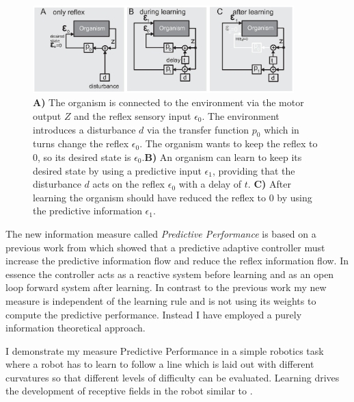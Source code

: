 \begin{figure}[!hbt]
	\begin{center}
		\includegraphics[width=0.9\textwidth]{figures/ppmeasure/1}
	\end{center}
	\caption[Information flow in the adaptive controller]{ 
	  {\bf A)} The organism is connected to the
          environment via the motor output $Z$ and the reflex sensory
          input $\epsilon_{0}$. The environment introduces a disturbance $d$
          via the transfer function $p_0$ which in turns change the
          reflex $\epsilon_{0}$. The organism wants to keep the reflex to 0, so
          its desired state is $\epsilon_{0}$.{\bf B)} An organism can learn to
          keep its desired state by using a predictive input $\epsilon_{1}$,
          providing that the disturbance $d$ acts on the reflex $\epsilon_{0}$
          with a delay of $t$. {\bf C)} After learning the organism
          should have reduced the reflex to 0 by using the predictive
          information $\epsilon_{1}$.  
	  \label{PPmeasure:Figure1}}
\end{figure}
 


The new information measure called 
\textsl{Predictive Performance} is based on a previous work from
\citet{RadicalConstruct} which showed
that a predictive adaptive controller must increase the predictive
information flow and reduce the reflex information flow.
In essence the controller acts as a reactive system before learning and as an
open loop forward system after learning. In contrast to the
previous work my new measure is independent of the learning
rule and is not using its weights to compute the predictive
performance. Instead I have employed a purely information theoretical
approach.

I demonstrate my measure Predictive Performance in a simple
robotics task where a robot has to learn to follow a line which is laid
out with different curvatures so that different levels of difficulty
can be evaluated. Learning drives the development of receptive
fields in the robot similar to \citet{Kulvicius2007:RFrobot}. 
 

